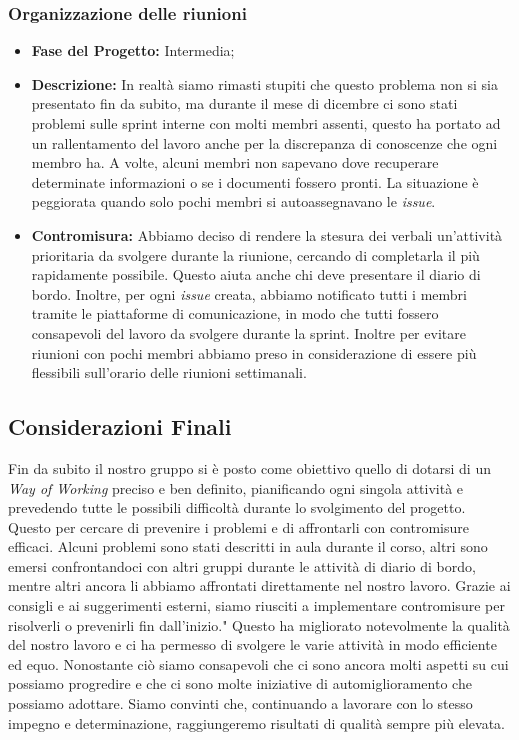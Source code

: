 \documentclass{article}
\begin{document}
\subsubsection{Organizzazione delle riunioni}
\begin{itemize}
    \item \textbf{Fase del Progetto:} Intermedia;
    \item \textbf{Descrizione:} In realtà siamo rimasti stupiti che questo problema non si sia presentato fin da subito, ma durante il mese di dicembre ci sono stati problemi sulle sprint interne con molti membri assenti, questo ha portato ad un rallentamento del lavoro anche per la discrepanza di conoscenze che ogni membro ha. A volte, alcuni membri non sapevano dove recuperare determinate informazioni o se i documenti fossero pronti. La situazione è peggiorata quando solo pochi membri si autoassegnavano le \textit{issue}.
    \item \textbf{Contromisura:} Abbiamo deciso di rendere la stesura dei verbali un'attività prioritaria da svolgere durante la riunione, cercando di completarla il più rapidamente possibile. Questo aiuta anche chi deve presentare il diario di bordo. Inoltre, per ogni \textit{issue} creata, abbiamo notificato tutti i membri tramite le piattaforme di comunicazione, in modo che tutti fossero consapevoli del lavoro da svolgere durante la sprint. Inoltre per evitare riunioni con pochi membri abbiamo preso in considerazione di essere più flessibili sull'orario delle riunioni settimanali.
\end{itemize}

\newpage
\subsection{Considerazioni Finali}
Fin da subito il nostro gruppo si è posto come obiettivo quello di dotarsi di un \textit{Way of Working} preciso e ben definito, pianificando ogni singola attività e prevedendo tutte le possibili difficoltà durante lo svolgimento del progetto.
Questo per cercare di prevenire i problemi e di affrontarli con contromisure efficaci. Alcuni problemi sono stati descritti in aula durante il corso, altri sono emersi confrontandoci con altri gruppi durante le attività di diario di bordo, mentre altri ancora li abbiamo affrontati direttamente nel nostro lavoro. Grazie ai consigli e ai suggerimenti esterni, siamo riusciti a implementare contromisure per risolverli o prevenirli fin dall'inizio."
Questo ha migliorato notevolmente la qualità del nostro lavoro e ci ha permesso di svolgere le varie attività in modo efficiente ed equo. Nonostante ciò siamo consapevoli che ci sono ancora molti aspetti su cui possiamo progredire e che ci sono molte iniziative di automiglioramento che possiamo adottare.
Siamo convinti che, continuando a lavorare con lo stesso impegno e determinazione, raggiungeremo risultati di qualità sempre più elevata.
\end{document}
